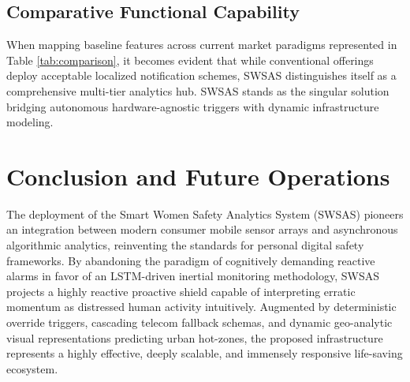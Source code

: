 \documentclass[10pt,journal,compsoc]{IEEEtran}
\begin{document}
\begin{table}[hbt!]
\caption{Systematic Comparison with State-of-the-Art Solutions}
\label{tab:comparison}
\centering
{}
\end{table}

\subsection{Comparative Functional Capability}
When mapping baseline features across current market paradigms represented in Table \ref{tab:comparison}, it becomes evident that while conventional offerings deploy acceptable localized notification schemes, SWSAS distinguishes itself as a comprehensive multi-tier analytics hub. SWSAS stands as the singular solution bridging autonomous hardware-agnostic triggers with dynamic infrastructure modeling.

\section{Conclusion and Future Operations}
The deployment of the Smart Women Safety Analytics System (SWSAS) pioneers an integration between modern consumer mobile sensor arrays and asynchronous algorithmic analytics, reinventing the standards for personal digital safety frameworks. By abandoning the paradigm of cognitively demanding reactive alarms in favor of an LSTM-driven inertial monitoring methodology, SWSAS projects a highly reactive proactive shield capable of interpreting erratic momentum as distressed human activity intuitively. Augmented by deterministic override triggers, cascading telecom fallback schemas, and dynamic geo-analytic visual representations predicting urban hot-zones, the proposed infrastructure represents a highly effective, deeply scalable, and immensely responsive life-saving ecosystem.
\end{document}
